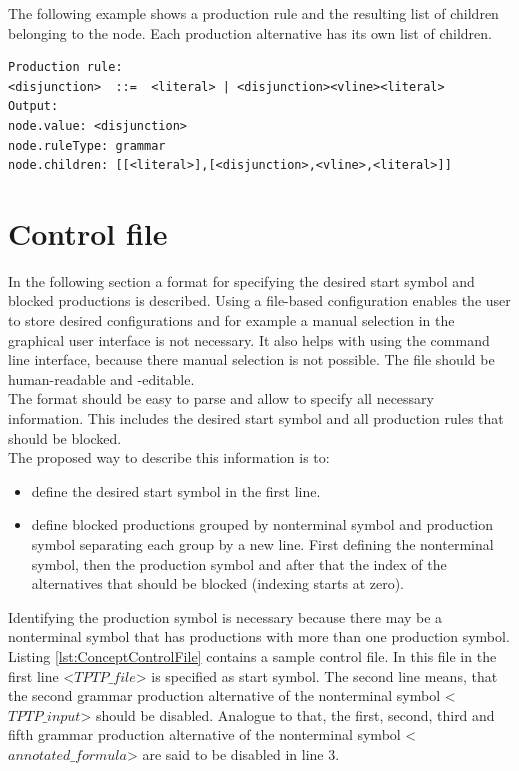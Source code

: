 The following example shows a production rule and the resulting list of children belonging to the node. Each production alternative has its own list of children. %
\begin{verbatim}
Production rule:
<disjunction>  ::=  <literal> | <disjunction><vline><literal>
Output:
node.value: <disjunction>
node.ruleType: grammar
node.children: [[<literal>],[<disjunction>,<vline>,<literal>]]
\end{verbatim}

\section{Control file}\label{sec:ConceptControlFile}
In the following section a format for specifying the desired start symbol and blocked productions is described.
Using a file-based configuration enables the user to store desired configurations and for example a manual selection in the graphical user interface is not necessary.
It also helps with using the command line interface, because there manual selection is not possible.
The file should be human-readable and -editable.\\
The format should be easy to parse and allow to specify all necessary information.
This includes the desired start symbol and all production rules that should be blocked.\\
The proposed way to describe this information is to:

\begin{itemize}%
	\item define the desired start symbol in the first line.
	\item define blocked productions grouped by nonterminal symbol and production symbol separating each group by a new line.
	First defining the nonterminal symbol, then the production symbol and after that the index of the alternatives that should be blocked (indexing starts at zero). 
\end{itemize}

Identifying the production symbol is necessary because there may be a nonterminal symbol that has productions with more than one production symbol.\\
Listing \ref{lst:ConceptControlFile} contains a sample control file. In this file in the first line <$TPTP\_file$> is specified as start symbol.
The second line means, that the second grammar production alternative of the nonterminal symbol <$TPTP\_input$> should be disabled.
Analogue to that, the first, second, third and fifth grammar production alternative of the nonterminal symbol <$annotated\_formula$> are said to be disabled in line 3.

